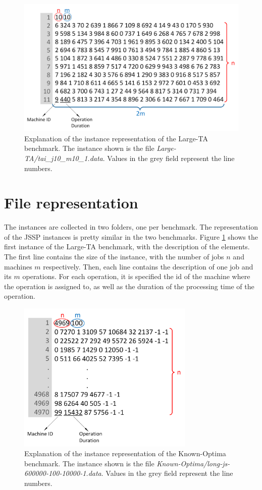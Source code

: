 \documentclass{article}
\begin{document}
\begin{figure}
	\centering
		\includegraphics[width=1\textwidth]{instance.png}
	\caption{Explanation of the instance representation of the Large-TA benchmark. The instance shown is the file \emph{Large-TA/tai\_j10\_m10\_1.data}. Values in the grey field represent the line numbers.}
	\label{fig:instance}
\end{figure}

\section{File representation}
The instances are collected in two folders, one per benchmark. The representation of the JSSP instances is pretty similar in the two benchmarks. Figure \ref{fig:instance} shows the first instance of the Large-TA benchmark, with the description of the elements. The first line contains the size of the instance, with the number of jobs $n$ and machines $m$ respectively. Then, each line contains the description of one job and its $m$ operations. For each operation, it is specified the id of the machine where the operation is assigned to, as well as the duration of the processing time of the operation. 

\begin{figure}
	\centering
		\includegraphics[width=0.75\textwidth]{instance2.png}
	\caption{Explanation of the instance representation of the Known-Optima benchmark. The instance shown is the file \emph{Known-Optima/long-js-600000-100-10000-1.data}. Values in the grey field represent the line numbers.}
	\label{fig:instance2}
\end{figure}
\end{document}
